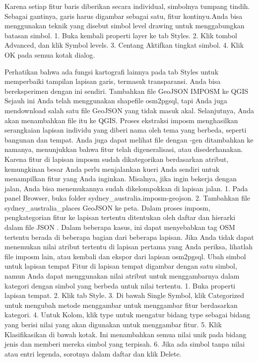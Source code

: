 Karena setiap fitur baris diberikan secara individual, simbolnya tumpang tindih. Sebagai gantinya, garis harus digambar sebagai satu, fitur kontinyu.Anda bisa menggunakan teknik yang disebut simbol level drawing untuk menggabungkan batasan simbol.
1.	Buka kembali properti layer ke tab Styles.
2.	Klik tombol Advanced, dan klik Symbol levels.
3.	Centang Aktifkan tingkat simbol.
4.	Klik OK pada semua kotak dialog.
 
Perhatikan bahwa ada fungsi kartografi lainnya pada tab Styles untuk memperbaiki tampilan lapisan garis, termasuk transparansi. Anda bisa bereksperimen dengan ini sendiri.
Tambahkan file GeoJSON IMPOSM ke QGIS
Sejauh ini Anda telah menggunakan shapefile osm2pgsql, tapi Anda juga mendownload salah satu file GeoJSON yang tidak masuk akal. Selanjutnya, Anda akan menambahkan file itu ke QGIS.
Proses ekstraksi imposm menghasilkan serangkaian lapisan individu yang diberi nama oleh tema yang berbeda, seperti bangunan dan tempat. Anda juga dapat melihat file dengan -gen ditambahkan ke namanya, menunjukkan bahwa fitur telah digeneralisasi, atau disederhanakan. Karena fitur di lapisan imposm sudah dikategorikan berdasarkan atribut, kemungkinan besar Anda perlu menjalankan kueri Anda sendiri untuk menampilkan fitur yang Anda inginkan. Misalnya, jika ingin bekerja dengan jalan, Anda bisa menemukannya sudah dikelompokkan di lapisan jalan.
1.	Pada panel Browser, buka folder sydney_australia.imposm-geojson.
2.	Tambahkan file sydney_australia_places GeoJSON ke peta.
Dalam proses imposm, pengkategorian fitur ke lapisan tertentu ditentukan oleh daftar dan hierarki dalam file JSON . Dalam beberapa kasus, ini dapat menyebabkan tag OSM tertentu berada di beberapa bagian dari beberapa lapisan. Jika Anda tidak dapat menemukan nilai atribut tertentu di lapisan pertama yang Anda periksa, lihatlah file imposm lain, atau kembali dan ekspor dari lapisan osm2pgsql.
Ubah simbol untuk lapisan tempat
Fitur di lapisan tempat digambar dengan satu simbol, namun Anda dapat menggunakan nilai atribut untuk menggambarnya dalam kategori dengan simbol yang berbeda untuk nilai tertentu.
1.	Buka properti lapisan tempat.
2.	Klik tab Style.
3.	Di bawah Single Symbol, klik Categorized untuk mengubah metode menggambar untuk menggambar fitur berdasarkan kategori.
4.	Untuk Kolom, klik type untuk mengatur bidang type sebagai bidang yang berisi nilai yang akan digunakan untuk menggambar fitur.
5.	Klik Klasifikasikan di bawah kotak. Ini menambahkan semua nilai unik pada bidang jenis dan memberi mereka simbol yang terpisah.
6.	Jika ada simbol tanpa nilai atau entri legenda, sorotnya dalam daftar dan klik Delete.
